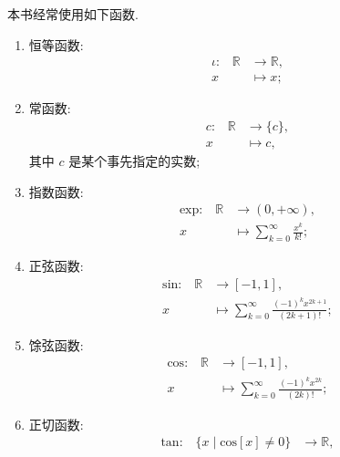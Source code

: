 \begin{definition}
    本书经常使用如下函数.
    \begin{enumerate}
        \item 恒等函数:
              \begin{align*}
                  \text{$\iota$:} \quad
                  \mathbb{R} & \to \mathbb{R}, \\
                  x          & \mapsto x;
              \end{align*}
        \item 常函数:
              \begin{align*}
                  \text{$c$:} \quad
                  \mathbb{R} & \to \{ c \}, \\
                  x          & \mapsto c,
              \end{align*}
              其中 $c$ 是某个事先指定的实数;
        \item 指数函数:
              \begin{align*}
                  \text{$\mathrm{exp}$:} \quad
                  \mathbb{R} & \to (0, +\infty),                               \\
                  x          & \mapsto \sum_{k = 0}^{\infty} {\frac{x^k}{k!}};
              \end{align*}
        \item 正弦函数:
              \begin{align*}
                  \text{$\mathrm{sin}$:} \quad
                  \mathbb{R} & \to [-1, 1],                                                     \\
                  x          & \mapsto \sum_{k = 0}^{\infty} {\frac{(-1)^k x^{2k+1}}{(2k+1)!}};
              \end{align*}
        \item 馀弦函数:
              \begin{align*}
                  \text{$\mathrm{cos}$:} \quad
                  \mathbb{R} & \to [-1, 1],                                                 \\
                  x          & \mapsto \sum_{k = 0}^{\infty} {\frac{(-1)^k x^{2k}}{(2k)!}};
              \end{align*}
        \item 正切函数:
              \begin{align*}
                  \text{$\mathrm{tan}$:} \quad
                  \{ x \mid \mathrm{cos} {[x]} \neq 0 \} & \to \mathbb{R},                                         \\

\end{align*}
\end{enumerate}
\end{definition}
